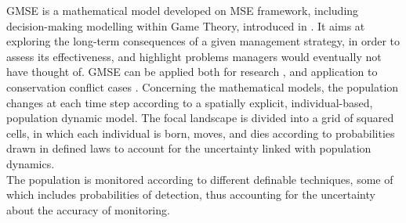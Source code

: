 \documentclass[12pt,a4paper]{article}
\begin{document}
GMSE is a mathematical  model developed on MSE framework, including decision-making modelling within Game Theory, introduced in \cite{duthie2018}.
It aims at exploring the long-term consequences of a given management strategy, in order to assess its effectiveness, and highlight problems managers would eventually not have thought of.
GMSE can be applied both for research \citep{cusack2018time}, and application to conservation conflict cases \citep{bainbridge2017goose}.
Concerning the mathematical models, the population changes at each time step according to a spatially explicit, individual-based, population dynamic model.
The focal landscape is divided into a grid of squared cells, in which  
each individual is born, moves, and dies according to probabilities drawn in defined laws to account for the uncertainty linked with population dynamics.\\
The population is monitored according to different definable techniques, some of which includes probabilities of detection, thus accounting for the uncertainty about the accuracy of monitoring.

\end{document}
